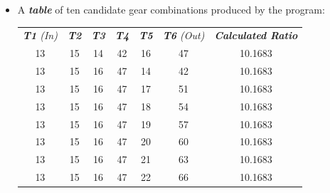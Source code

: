 \documentclass[12pt]{article}
\begin{document}
\begin{itemize}
\begin{lstlisting}
print("\nTop 10 Candidate Gear Combinations:")
print(df.to_string(index=False))
        \end{lstlisting}

    \item [(c)] A \textit{\textbf{table}} of ten candidate gear combinations produced by the program:

          \begin{table}[H]
              \centering
              \begin{tabular}{ccccccc}
                  \textit{\textbf{T1} (In)} & \textit{\textbf{T2}} & \textit{\textbf{T3}} & \textit{\textbf{T4}} & \textit{\textbf{T5}} & \textit{\textbf{T6} (Out)} & \textit{\textbf{Calculated Ratio}} \\
                  13                        & 15                   & 14                   & 42                   & 16                   & 47                         & 10.1683                            \\
                  13                        & 15                   & 16                   & 47                   & 14                   & 42                         & 10.1683                            \\
                  13                        & 15                   & 16                   & 47                   & 17                   & 51                         & 10.1683                            \\
                  13                        & 15                   & 16                   & 47                   & 18                   & 54                         & 10.1683                            \\
                  13                        & 15                   & 16                   & 47                   & 19                   & 57                         & 10.1683                            \\
                  13                        & 15                   & 16                   & 47                   & 20                   & 60                         & 10.1683                            \\
                  13                        & 15                   & 16                   & 47                   & 21                   & 63                         & 10.1683                            \\
                  13                        & 15                   & 16                   & 47                   & 22                   & 66                         & 10.1683                            \\

\end{tabular}
\end{table}
\end{itemize}
\end{document}
